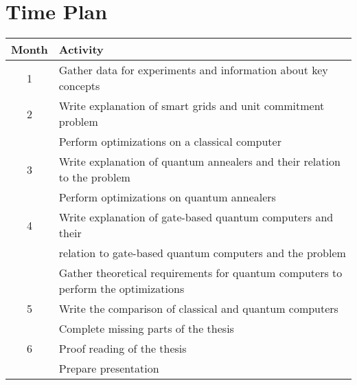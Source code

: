 \section{Time Plan}

\begin{table}[h!]
  \begin{tabular}{|| c | l ||}
    \hline
    Month & Activity \\
    \hline \hline
    1 & Gather data for experiments and information about key concepts \\ \hline
    2 & Write explanation of smart grids and unit commitment problem \\
    & Perform optimizations on a classical computer \\ \hline
    3 & Write explanation of quantum annealers and their relation to the problem \\
    & Perform optimizations on quantum annealers \\ \hline
    4 & Write explanation of gate-based quantum computers and their \\
    & relation to gate-based quantum computers and the problem \\
    & Gather theoretical requirements for quantum computers to perform the optimizations \\ \hline
    5 & Write the comparison of classical and quantum computers \\
    & Complete missing parts of the thesis \\ \hline
    6 & Proof reading of the thesis \\
    & Prepare presentation \\ \hline
  \end{tabular}
\end{table}
